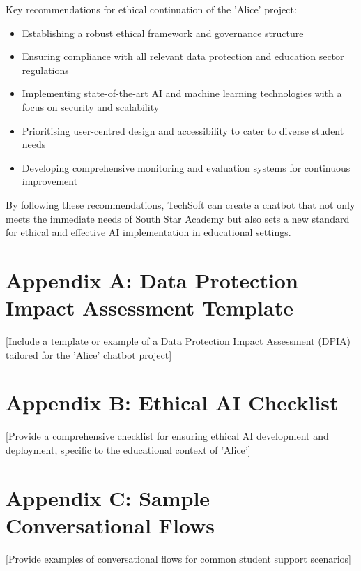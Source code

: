 \documentclass[15pt,a4paper]{article}
\begin{document}
\begin{multicols}{2}
Key recommendations for ethical continuation of the 'Alice' project:
\begin{itemize}
  \item Establishing a robust ethical framework and governance structure
  \item Ensuring compliance with all relevant data protection and education sector regulations
  \item Implementing state-of-the-art AI and machine learning technologies with a focus on security and scalability
  \item Prioritising user-centred design and accessibility to cater to diverse student needs
  \item Developing comprehensive monitoring and evaluation systems for continuous improvement
\end{itemize}


By following these recommendations, TechSoft can create a chatbot that not only meets the immediate needs of South Star Academy but also sets a new standard for ethical and effective AI implementation in educational settings.


\end{multicols}

\newpage
\appendix
\section{Appendix A: Data Protection Impact Assessment Template}\label{appendix:a}
[Include a template or example of a Data Protection Impact Assessment (DPIA) tailored for the 'Alice' chatbot project]

\section{Appendix B: Ethical AI Checklist}\label{appendix:b}
[Provide a comprehensive checklist for ensuring ethical AI development and deployment, specific to the educational context of 'Alice']

\section{Appendix C: Sample Conversational Flows}\label{appendix:c}
[Provide examples of conversational flows for common student support scenarios]

\printbibliography
\end{document}
